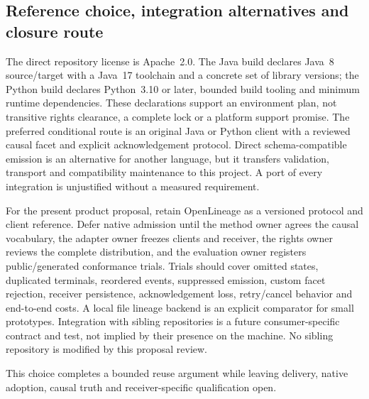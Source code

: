 \subsection{Reference choice, integration alternatives and closure route}
The direct repository license is Apache~2.0. The Java build declares Java~8
source/target with a Java~17 toolchain and a concrete set of library versions;
the Python build declares Python~3.10 or later, bounded build tooling and
minimum runtime dependencies. These declarations support an environment
plan, not transitive rights clearance, a complete lock or a platform support
promise. The preferred conditional route is an original Java or Python client
with a reviewed causal facet and explicit acknowledgement protocol. Direct
schema-compatible emission is an alternative for another language, but it
transfers validation, transport and compatibility maintenance to this project.
A port of every integration is unjustified without a measured requirement.
\citep{exec24_openlineage_source}

For the present product proposal, retain OpenLineage as a versioned protocol
and client reference. Defer native admission until the method owner agrees
the causal vocabulary, the adapter owner freezes clients and receiver,
the rights owner reviews the complete distribution, and the evaluation owner
registers public/generated conformance trials. Trials should cover omitted
states, duplicated terminals, reordered events, suppressed emission, custom
facet rejection, receiver persistence, acknowledgement loss, retry/cancel
behavior and end-to-end costs. A local file lineage backend is an explicit
comparator for small prototypes. Integration with sibling repositories is a
future consumer-specific contract and test, not implied by their presence
on the machine. No sibling repository is modified by this proposal review.

This choice completes a bounded reuse argument while leaving delivery,
native adoption, causal truth and receiver-specific qualification open.
